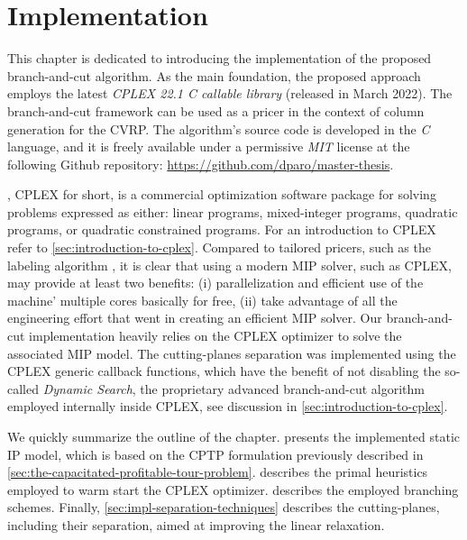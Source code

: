 \chapter{Implementation}
\label{sec:implementation-chapter}

This chapter is dedicated to introducing the implementation
of the proposed branch-and-cut algorithm.
As the main foundation, the proposed approach employs
the latest \textit{CPLEX 22.1 C callable library} (released in March 2022).
The branch-and-cut framework can be used as a pricer in the context
of column generation for the CVRP.
The algorithm's source code is developed in the \textit{C} language,
and it is freely available under a permissive \textit{MIT} license
at the following Github repository: \url{https://github.com/dparo/master-thesis}.

\medskip

,
CPLEX for short,
is a commercial optimization software package for solving problems expressed as either:
linear programs, mixed-integer programs, quadratic programs, or quadratic constrained programs.
For an introduction to CPLEX refer to \cref{sec:introduction-to-cplex}.
Compared to tailored pricers, such as the labeling algorithm \parencite{desrochers1992, feillet2004},
it is clear that using a modern MIP solver, such as CPLEX,
may provide at least two benefits:
(i) parallelization and efficient use of the machine' multiple cores basically for free,
(ii) take advantage of all the engineering effort that went in creating an efficient MIP solver.
Our branch-and-cut implementation heavily relies on the CPLEX optimizer
to solve the associated MIP model.
The cutting-planes separation was implemented using the CPLEX generic callback functions,
which have the benefit of not disabling the so-called \textit{Dynamic Search},
the proprietary advanced branch-and-cut algorithm employed internally inside CPLEX,
see discussion in \cref{sec:introduction-to-cplex}.

\medskip


We quickly summarize the outline of the chapter.
 presents the implemented static IP model,
which is based on the CPTP formulation previously described in \cref{sec:the-capacitated-profitable-tour-problem}.
 describes the primal heuristics employed
to warm start the CPLEX optimizer.
 describes the employed branching schemes.
Finally, \cref{sec:impl-separation-techniques} describes the cutting-planes,
including their separation,
aimed at improving the linear relaxation.


